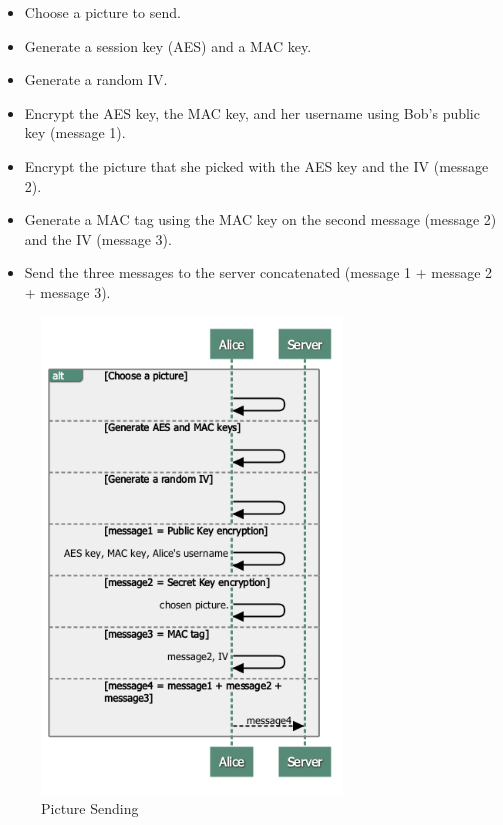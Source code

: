 	    \begin{itemize}
	     \item Choose a picture to send.
	     \item Generate a session key (AES) and a MAC key.
	     \item Generate a random IV.
	     \item Encrypt the AES key, the MAC key, and her username using Bob's public key (message 1).
	     \item Encrypt the picture that she picked with the AES key and the IV (message 2).
	     \item Generate a MAC tag using the MAC key on the second message (message 2) and the IV (message 3).
	     \item Send the three messages to the server concatenated (message 1 + message 2 + message 3).
	    \end{itemize}
	    
	    \begin{figure}[H]
	    
	      \centering
	      \includegraphics[width=8cm]{images/architecture/picture_sending}
	      \caption{Picture Sending}
	     
	    \end{figure}
	    
